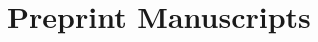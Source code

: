 \section*{Preprint Manuscripts}

\begin{refsection}
    \nocite{*}
    \printbibliography[heading=none]
\end{refsection}